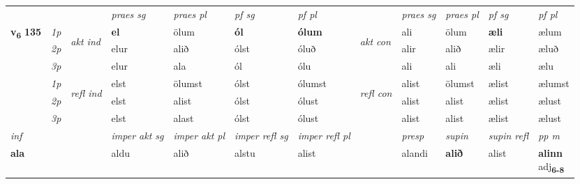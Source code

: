\begin{longtable}[l]{X>{\footnotesize\itshape}llXXXXlXXXX}
 & &   & \textit{praes sg}  & \textit{praes pl}    & \textit{ pf sg} & \textit{pf pl} & & \textit{praes sg}  & \textit{praes pl}    & \textit{pf sg} & \textit{pf pl }  \\ \cmidrule{4-7} \cmidrule{9-12}
 \multirow{2}{*}{{{\textbf{v{\textsubscript{6}}} \Large{\textbf{135}}}}}  & 1p & \multirow{3}{*}{\begin{turn}{90}\textit{akt ind}\end{turn}} & \textbf{el} & ölum & \textbf{ól} & \textbf{ólum} & \multirow{3}{*}{\begin{turn}{90}\textit{akt con}\end{turn}} &ali & ölum & \textbf{æli} & ælum\\*
 & 2p &  &  elur  & alið & ólst & óluð & & alir & alið & ælir & æluð \\*
 & 3p &  & elur & ala & ól & ólu & & ali & ali& æli & ælu \\*
\cmidrule{4-7} \cmidrule{9-12}
 & 1p & \multirow{3}{*}{\begin{turn}{90}\textit{refl ind}\end{turn}}  & elst & ölumst & ólst & ólumst & \multirow{3}{*}{\begin{turn}{90}\textit{refl con}\end{turn}}  &alist & ölumst & ælist & ælumst \\*
 & 2p &  & elst & alist & ólst & ólust & &alist & alist & ælist & ælust \\*
 & 3p  & & elst & alast & ólst & ólust & & alist & alist& ælist & ælust \\*
\cmidrule{4-7} \cmidrule{9-12}

   {\textit{inf}} & &  & \textit{imper akt sg} & \textit{imper akt pl} & \textit{imper refl sg} & \textit{imper refl pl} && \textit{presp} & \textit{supin} & \textit{supin refl} & \textit{pp m} \\*
  {\textbf{ala}} & && aldu  & alið & alstu & alist && alandi &  \textbf{alið} & alist & \specialcell{\textbf{alinn} \\ adj\textbf{\textsubscript{6-8}}} \\*

\midrule


\end{longtable}
